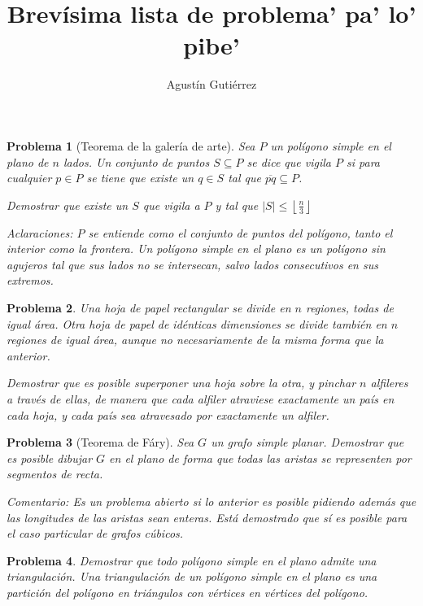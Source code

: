 \documentclass{article}
\title{Brevísima lista de problema' pa' lo' pibe'}
\author{Agustín Gutiérrez}
\date{}
\newtheorem{problema}{{\sc Problema}}
\begin{document}
\maketitle

\begin{problema}[Teorema de la galería de arte]
Sea $P$ un polígono simple en el plano de $n$ lados. Un conjunto de puntos $S \subseteq P$ se dice que vigila $P$ si para cualquier
$p \in P$ se tiene que existe un $q \in S$ tal que $\overline{pq} \subseteq P$.

Demostrar que existe un $S$ que vigila a $P$ y tal que $|S| \leq \left \lfloor \frac{n}{3} \right \rfloor$

Aclaraciones: $P$ se entiende como el conjunto de puntos del polígono, tanto el interior como la frontera. Un polígono simple
en el plano es un polígono sin agujeros tal que sus lados no se intersecan, salvo lados consecutivos en sus extremos.
\end{problema}

\begin{problema}
Una hoja de papel rectangular se divide en $n$ regiones, todas de igual área. Otra hoja de papel de idénticas dimensiones
se divide también en $n$ regiones de igual área, aunque no necesariamente de la misma forma que la anterior.

Demostrar que es posible superponer una hoja sobre la otra, y pinchar $n$ alfileres a través de ellas, de manera que
cada alfiler atraviese exactamente un país en cada hoja, y cada país sea atravesado por exactamente un alfiler.
\end{problema}

\begin{problema}[Teorema de Fáry]
Sea $G$ un grafo simple planar. Demostrar que es posible dibujar $G$ en el plano de forma que todas las aristas se representen
por segmentos de recta.

Comentario: Es un problema abierto si lo anterior es posible pidiendo además que las longitudes de las aristas sean enteras. 
Está demostrado que sí es posible para el caso particular de grafos cúbicos.
\end{problema}

\begin{problema}
Demostrar que todo polígono simple en el plano admite una triangulación. Una triangulación de un polígono simple en el plano
es una partición del polígono en triángulos con vértices en vértices del polígono.
\end{problema}
\end{document}
